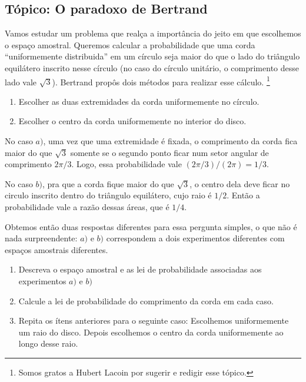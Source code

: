 \begin{topics}

\section{Tópico: O paradoxo de Bertrand}

Vamos estudar um problema que realça a importância do jeito em que escolhemos o espaço amostral.
Queremos calcular a probabilidade que uma corda ``uniformemente distribuida'' em um círculo seja maior do que o lado do triângulo equilátero inscrito nesse  círculo (no caso do círculo unitário, o comprimento desse lado vale $\sqrt{3}$).
Bertrand propôs dois métodos para realizar esse cálculo.  \footnote{Somos gratos a Hubert Lacoin por sugerir e redigir esse tópico.}

\begin{enumerate}[\quad a)]
 \item Escolher as duas extremidades da corda uniformemente no círculo.
 \item Escolher o centro da corda uniformemente no interior do disco.
\end{enumerate}

No caso $a)$, uma vez que uma extremidade é fixada, o comprimento da corda fica maior do que $\sqrt{3}$ somente se o segundo ponto ficar num setor angular de comprimento $2 \pi / 3$.
Logo, essa probabilidade vale $(2\pi/3) / (2\pi) = 1/3$.

\medskip

No caso $b)$, pra que a corda fique maior do que $\sqrt{3}$, o centro dela deve ficar no circulo inscrito dentro do triângulo equilátero, cujo raio é $1/2$.
Então a probabilidade vale a razão dessas áreas, que é $1/4$.

\medskip

Obtemos então duas respostas diferentes para essa pergunta simples, o que não é nada surpreendente: $a)$ e $b)$ correspondem a dois experimentos
diferentes com espaços amostrais diferentes.


\begin{exercise}
\begin{enumerate}[\quad a)]
 \item Descreva o espaço amostral e as lei de probabilidade associadas aos experimentos $a)$ e $b)$
 \item Calcule a lei de probabilidade do comprimento da corda em cada caso.
 \item Repita os ítens anteriores para o seguinte caso: Escolhemos uniformemente um raio do disco.
Depois escolhemos o centro da corda uniformemente ao longo desse raio.
\end{enumerate}

\end{exercise}

\end{topics}

